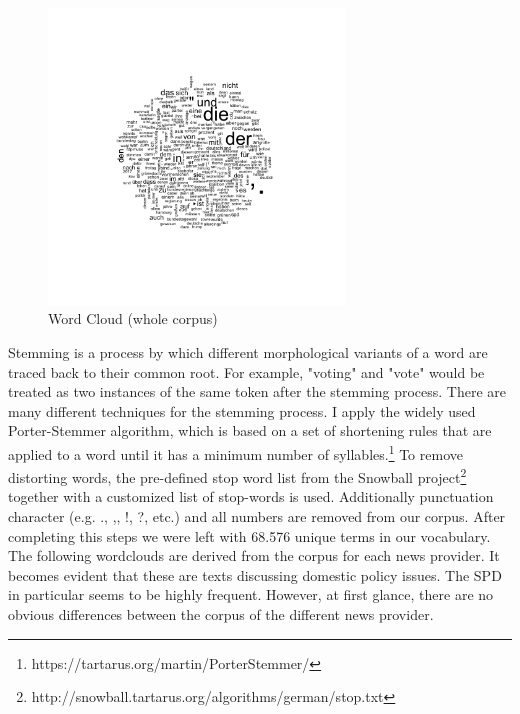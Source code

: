 \documentclass[12pt,a4paper,notitlepage]{article}
\begin{document}
\begin{figure}[H]
	\begin{center}
		\includegraphics[width=0.7\textwidth]{../figs/wordcloud.png}
		\caption{Word Cloud (whole corpus)}
		\label{fig_wordcloud1}
	\end{center}
\end{figure}

Stemming is a process by which different morphological variants of a word are traced back to their common root. For example, "voting" and "vote" would be treated as two instances of the same token after the stemming process. There are many different techniques for the stemming process. I apply the widely used Porter-Stemmer algorithm, which is based on a set of shortening rules that are applied to a word until it has a minimum number of syllables.\footnote{https://tartarus.org/martin/PorterStemmer/} To remove distorting words, the pre-defined stop word list from the Snowball project\footnote{http://snowball.tartarus.org/algorithms/german/stop.txt} together with a customized list of stop-words is used. Additionally punctuation character (e.g. ., ,, !, ?, etc.) and all numbers are removed from our corpus. After completing this steps we were left with 68.576 unique terms in our vocabulary. The following wordclouds are derived from the corpus for each news provider. It becomes evident that these are texts discussing domestic policy issues. The SPD in particular seems to be highly frequent. However, at first glance, there are no obvious differences between the corpus of the different news provider.  
\end{document}

